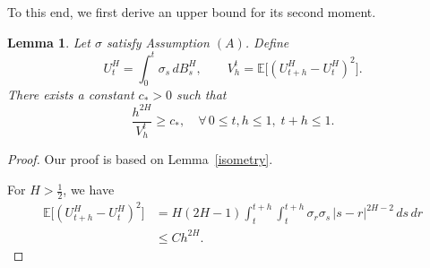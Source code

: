 \documentclass[preprint,12pt]{elsarticle}
\newtheorem{lemma}[theorem]{Lemma}
\theoremstyle{definition}  %
\theoremstyle{plain}  %
\begin{document}
To this end, we first derive an upper bound for its second moment.

\begin{lemma}\label{variance}
	Let \(\sigma\) satisfy Assumption \((A)\).
Define
\[
	U_t^H = \int_0^t \sigma_s \, dB^H_s, 
	\qquad 
	V_h^t = \mathbb{E}\big[(U_{t+h}^H-U_t^H)^2\big].
\]
There exists a constant $c_*>0$ such that 
\begin{equation*}
	\frac{h^{2H}}{V_h^t} \geq c_*, 
	\quad \forall\, 0 \leq t,h \leq 1,\; t+h \leq 1.
\end{equation*}
\end{lemma}
\begin{proof}
Our proof is based on Lemma~\ref{isometry}.
	
For $H > \tfrac{1}{2}$, we have
\begin{align*}
	\mathbb{E}\big[(U_{t+h}^H-U_t^H)^2\big]
	&= H(2H-1)\int_t^{t+h}\!\!\int_t^{t+h} \sigma_r\sigma_s\,|s-r|^{2H-2}\,ds\,dr \\
	&\leq C h^{2H}.
\end{align*}


\end{proof}
\end{document}
